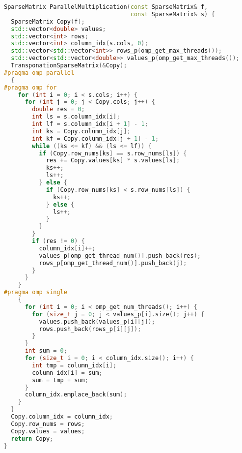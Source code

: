 \documentclass{report}
\begin{document}
\begin{lstlisting}[language=C++]
SparseMatrix ParallelMultiplication(const SparseMatrix& f,
                                    const SparseMatrix& s) {
  SparseMatrix Copy(f);
  std::vector<double> values;
  std::vector<int> rows;
  std::vector<int> column_idx(s.cols, 0);
  std::vector<std::vector<int>> rows_p(omp_get_max_threads());
  std::vector<std::vector<double>> values_p(omp_get_max_threads());
  TransponationSparseMatrix(&Copy);
#pragma omp parallel
  {
#pragma omp for
    for (int i = 0; i < s.cols; i++) {
      for (int j = 0; j < Copy.cols; j++) {
        double res = 0;
        int ls = s.column_idx[i];
        int lf = s.column_idx[i + 1] - 1;
        int ks = Copy.column_idx[j];
        int kf = Copy.column_idx[j + 1] - 1;
        while ((ks <= kf) && (ls <= lf)) {
          if (Copy.row_nums[ks] == s.row_nums[ls]) {
            res += Copy.values[ks] * s.values[ls];
            ks++;
            ls++;
          } else {
            if (Copy.row_nums[ks] < s.row_nums[ls]) {
              ks++;
            } else {
              ls++;
            }
          }
        }
        if (res != 0) {
          column_idx[i]++;
          values_p[omp_get_thread_num()].push_back(res);
          rows_p[omp_get_thread_num()].push_back(j);
        }
      }
    }
#pragma omp single
    {
      for (int i = 0; i < omp_get_num_threads(); i++) {
        for (size_t j = 0; j < values_p[i].size(); j++) {
          values.push_back(values_p[i][j]);
          rows.push_back(rows_p[i][j]);
        }
      }
      int sum = 0;
      for (size_t i = 0; i < column_idx.size(); i++) {
        int tmp = column_idx[i];
        column_idx[i] = sum;
        sum = tmp + sum;
      }
      column_idx.emplace_back(sum);
    }
  }
  Copy.column_idx = column_idx;
  Copy.row_nums = rows;
  Copy.values = values;
  return Copy;
}
\end{lstlisting}
\end{document}
